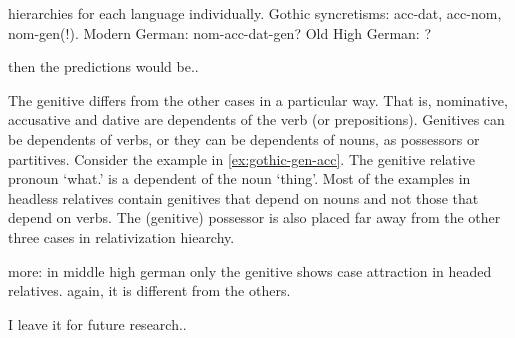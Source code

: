hierarchies for each language individually. Gothic syncretisms: acc-dat, acc-nom, nom-gen(!). Modern German: nom-acc-dat-gen? Old High German: ?

then the predictions would be..

The genitive differs from the other cases in a particular way. That is, nominative, accusative and dative are dependents of the verb (or prepositions). Genitives can be dependents of verbs, or they can be dependents of nouns, as possessors or partitives. Consider the example in \ref{ex:gothic-gen-acc}. The genitive relative pronoun  `what.' is a dependent of the noun  `thing'. Most of the examples in headless relatives contain genitives that depend on nouns and not those that depend on verbs. The (genitive) possessor is also placed far away from the other three cases in  relativization hiearchy.

more: in middle high german only the genitive shows case attraction in headed relatives. again, it is different from the others.

I leave it for future research..
